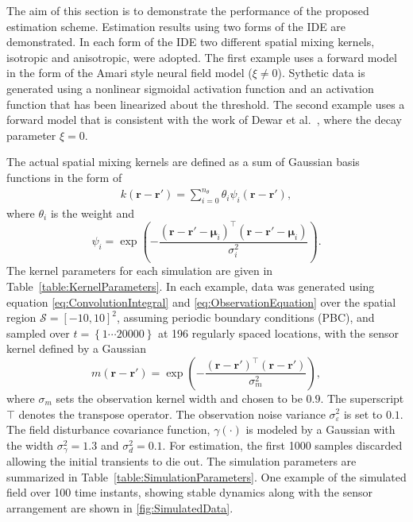 \documentclass[10pt,twocolumn,twoside]{IEEEtran}
\begin{document}
The aim of this section is to demonstrate the performance of the proposed estimation scheme. Estimation results using two forms of the IDE are demonstrated. In each form of the IDE two different spatial mixing kernels, isotropic and anisotropic, were adopted. The first example uses a forward model in the form of the Amari style neural field model \cite{Amari1977} ($\xi\neq 0$). Sythetic data is generated using a nonlinear sigmoidal activation function and an activation function that has been linearized about the threshold. The second example uses a forward model that is consistent with the work of Dewar et al.~\cite{Dewar2007}, where the decay parameter $\xi=0$.

The actual spatial mixing kernels are defined as a sum of Gaussian basis functions in the form of
\begin{align}\label{eq:sumofGaussians}
 k\left(\mathbf{r}-\mathbf{r}'\right)=\sum_{i=0}^{n_{\theta}}\theta_i\psi_i\left(\mathbf{r}-\mathbf{r}'\right), 
 \end{align}
where $\theta_i$ is the weight and
\begin{equation}\label{eq:Kernelbasis}
	\psi_i=\exp{\left(-\frac{(\mathbf{r}-\mathbf{r}'-\boldsymbol\mu_i)^\top(\mathbf{r}-\mathbf{r}'-\boldsymbol\mu_i)}{\sigma_i^2}\right)}.
\end{equation}
The kernel parameters for each simulation are given in Table~\ref{table:KernelParameters}. In each example, data was generated using equation \eqref{eq:ConvolutionIntegral} and \eqref{eq:ObservationEquation} over the spatial region $\mathcal{S}=[-10,10]^2 $, assuming periodic boundary conditions (PBC), and sampled over $t=\left\lbrace1 \cdots 20000  \right\rbrace $ at 196 regularly spaced locations, with the sensor kernel defined by a Gaussian
\begin{equation}\label{eq:observationkernel}
 	m\left(\mathbf{r}-\mathbf{r}'\right) = \exp{\left(-\frac{(\mathbf{r}-\mathbf{r}')^\top(\mathbf{r}-\mathbf{r}')}{\sigma_m^2}\right)},
 \end{equation} 
 where $\sigma_m$ sets the observation kernel width and chosen to be $0.9$. The superscript $\top$ denotes the transpose operator. The observation noise variance $\sigma_{\varepsilon}^2$ is set to $0.1$. The field disturbance covariance function, $\gamma(\cdot)$ is modeled by a Gaussian with the width $\sigma_{\gamma}^2=1.3$ and $\sigma_d^2=0.1$. For estimation, the first 1000 samples discarded allowing the initial transients to die out.  The simulation parameters are summarized in Table~\ref{table:SimulationParameters}. One example of the simulated field over 100 time instants, showing stable dynamics along with the sensor arrangement are shown in \figurename{\ref{fig:SimulatedData}}.
\end{document}
